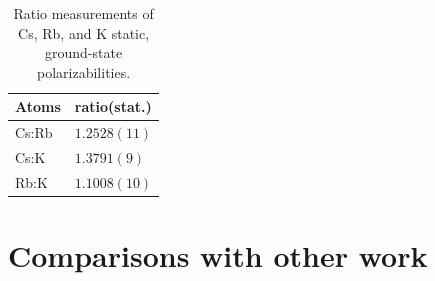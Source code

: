 \documentclass[twocolumn, prl,showpacs,superscriptaddress]{revtex4-1}   %
\newcommand{\ratRbK}{1.1008(10)}
\newcommand{\ratCsK}{1.3791(9)}
\newcommand{\ratCsRb}{1.2528(11)}
\begin{document}
\begingroup
\begin{table}
\caption{\label{tableRatio}Ratio measurements of Cs, Rb, and K static, ground-state polarizabilities.}
\begin{center}
\begin{tabular}{l l}
\hline\hline
Atoms & ratio(stat.) \\
\hline
Cs:Rb & $\ratCsRb$ \\
Cs:K  & $\ratCsK$ \\
Rb:K  & $\ratRbK$ \\
\hline\hline
\end{tabular}
\end{center}
\end{table}
\endgroup


\section{Comparisons with other work}
\end{document}
